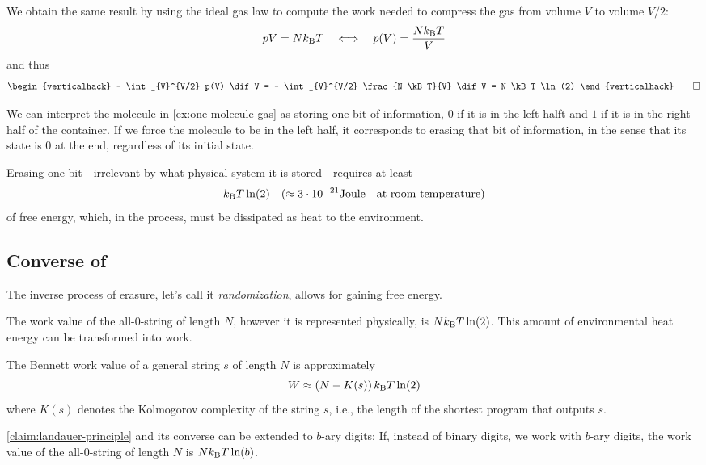 \begin{example}
We obtain the same result by using the ideal gas law to compute the work needed to compress the gas from volume \(V\) to volume \(V/2\): 
\[
p V = N k_{\mathrm{B}} T 
\quad
\Longleftrightarrow
\quad
p(V) = \frac{N k_{\mathrm{B}} T}{V}
\]
and thus
\[
\begin{verticalhack}
- \int_{V}^{V/2} p(V) \dif V
=
- \int_{V}^{V/2} \frac{N \kB T}{V} \dif V
=
N \kB T \ln(2)
\end{verticalhack}
\qedhere
\]
\end{example}


We can interpret the molecule in \autoref{ex:one-molecule-gas} as storing one bit of information, $0$ if it is in the left halft and $1$ if it is in the right half of the container.
If we force the molecule to be in the left half, it corresponds to erasing that bit of information, in the sense that its state is $0$ at the end, regardless of its initial state.
\begin{claim}\label{claim:landauer-principle}
Erasing one bit - irrelevant by what physical system it is stored - requires at least
\[
k_{\mathrm{B}} T \ln(2) \quad(\approx 3 \cdot 10^{-21} \text{Joule} \quad \text{at room temperature})
\]
of free energy, which, in the process, must be dissipated as heat to the environment.
\end{claim}

\subsection{Converse of }

The inverse process of erasure, let's call it \emph{randomization}, allows for gaining free energy.
\begin{example}
The work value of the all-$0$-string of length $N$, however it is represented physically, is $N k_{\mathrm{B}} T \ln(2)$.
This amount of environmental heat energy can be transformed into work.
\end{example}


The Bennett work value of a general string $s$ of length $N$ is approximately
\[
W \approx (N - K(s)) \, k_{\mathrm{B}} T \ln(2)
\]
where $K(s)$ denotes the Kolmogorov complexity of the string $s$, i.e., the length of the shortest program that outputs $s$.



\autoref{claim:landauer-principle} and its converse can be extended to $b$-ary digits:
If, instead of binary digits, we work with $b$-ary digits, the work value of the all-$0$-string of length $N$ is $N k_{\mathrm{B}} T \ln(b)$.

